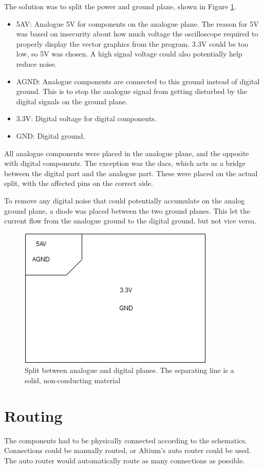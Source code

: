 The solution was to split the power and ground plane, shown in Figure \ref{fig:Split planes}.
\begin{itemize}
\item 5AV: Analogue 5V for components on the analogue plane.
The reason for 5V was based on insecurity about how much voltage the oscilloscope required to properly display the vector graphics from the program.
3.3V could be too low, so 5V was chosen.
A high signal voltage could also potentially help reduce noise.
\item AGND: Analogue components are connected to this ground instead of digital ground.
This is to stop the analogue signal from getting disturbed by the digital signals on the ground plane.
\item 3.3V: Digital voltage for digital components.
\item GND: Digital ground.
\end{itemize}

All analogue components were placed in the analogue plane, and the opposite with digital components.
The exception was the \gls{dac}s, which acts as a bridge between the digital part and the analogue part.
These were placed on the actual split, with the affected pins on the correct side.

To remove any digital noise that could potentially accumulate on the analog ground plane, a diode was placed between the two ground planes.
This let the current flow from the analogue ground to the digital ground, but not vice versa.

\begin{figure}[h!]
\centering
\includegraphics[scale = 0.6]{images/Split_planes.png}
\caption{Split between analogue and digital planes. The separating line is a solid, non-conducting material}
\label{fig:Split planes}
\end{figure}

\section{Routing}
The components had to be physically connected according to the schematics.
Connections could be manually routed, or Altium's auto router could be used.
The auto router would automatically route as many connections as possible.

